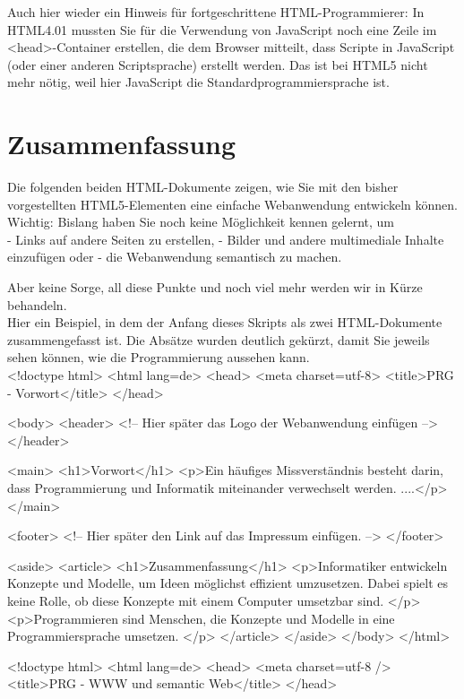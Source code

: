 Auch hier wieder ein Hinweis für fortgeschrittene HTML-Programmierer: In HTML4.01 mussten Sie für die Verwendung von JavaScript noch eine Zeile im <head>-Container erstellen, die dem Browser mitteilt, dass Scripte in JavaScript (oder einer anderen Scriptsprache) erstellt werden. Das ist bei HTML5 nicht mehr nötig, weil hier JavaScript die Standardprogrammiersprache  ist.

\section{Zusammenfassung}

Die folgenden beiden HTML-Dokumente zeigen, wie Sie mit den bisher vorgestellten HTML5-Elementen eine einfache Webanwendung entwickeln können. Wichtig: Bislang haben Sie noch keine Möglichkeit kennen gelernt, um\\

-	Links auf andere Seiten zu erstellen,
-	Bilder und andere multimediale Inhalte einzufügen oder
-	die Webanwendung semantisch zu machen.

Aber keine Sorge, all diese Punkte und noch viel mehr werden wir in Kürze behandeln.\\

Hier ein Beispiel, in dem der Anfang dieses Skripts als zwei HTML-Dokumente zusammengefasst ist. Die Absätze wurden deutlich gekürzt, damit Sie jeweils sehen können, wie die Programmierung aussehen kann.\\

<!doctype html> 
<html lang=de> 
<head> 
<meta charset=utf-8>
<title>PRG - Vorwort</title> 
</head> 

<body> 
<header>
<!-- Hier später das Logo der Webanwendung einfügen -->
</header>

<main>
<h1>Vorwort</h1>
<p>Ein häufiges Missverständnis besteht darin, dass Programmierung und Informatik miteinander verwechselt werden. ....</p> 
</main>

<footer>
<!-- Hier später den Link auf das Impressum einfügen. -->
</footer>

<aside>
<article>
<h1>Zusammenfassung</h1>
<p>Informatiker entwickeln Konzepte und Modelle, um Ideen möglichst effizient umzusetzen. Dabei spielt es keine Rolle, ob diese Konzepte mit einem Computer umsetzbar sind.
</p>
<p>Programmieren sind Menschen, die Konzepte und Modelle in eine Programmiersprache umsetzen.
</p>
</article>
</aside>
</body> 
</html>

<!doctype html> 
<html lang=de> 
<head> 
<meta charset=utf-8 />
<title>PRG - WWW und semantic Web</title> 
</head> 

